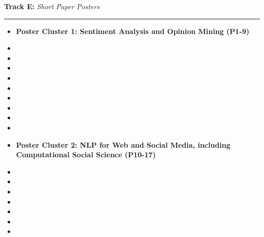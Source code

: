 \bigskip{}
\noindent \textbf{Track E:} \emph{Short Paper Posters} \hfill \emph{}\smallskip{}

\noindent \rule[0.5ex]{1\columnwidth}{1pt}
\begin{itemize}
\item []\textbf{Poster Cluster 1: Sentiment Analysis and Opinion Mining (P1-9)}
\item {}
\item {}
\item {}
\item {}
\item {}
\item {}
\item {}
\item {}
\item {}
\item []\textbf{Poster Cluster 2: NLP for Web and Social Media, including Computational Social Science (P10-17)}
\item {}
\item {}
\item {}
\item {}
\item {}
\item {}
\item {}
\end{itemize}

\clearpage
